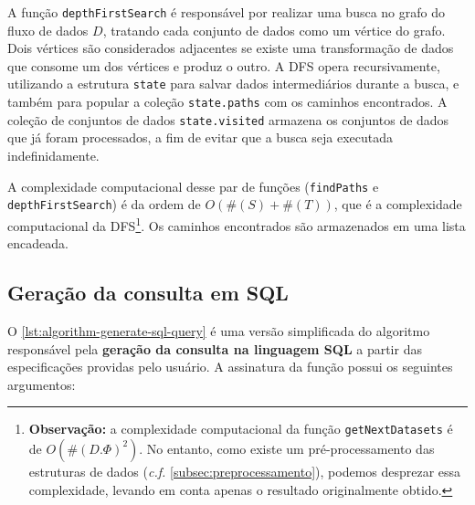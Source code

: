 A função \texttt{depthFirstSearch} é responsável por realizar uma busca no grafo do fluxo de dados \(D\), tratando cada conjunto de dados como um vértice do grafo. Dois vértices são considerados adjacentes se existe uma transformação de dados que consome um dos vértices e produz o outro. A DFS opera recursivamente, utilizando a estrutura \texttt{state} para salvar dados intermediários durante a busca, e também para popular a coleção \texttt{state.paths} com os caminhos encontrados. A coleção de conjuntos de dados \texttt{state.visited} armazena os conjuntos de dados que já foram processados, a fim de evitar que a busca seja executada indefinidamente.

A complexidade computacional desse par de funções (\texttt{findPaths} e \texttt{depthFirstSearch}) é da ordem de \(O(\#(S) + \#(T))\), que é a complexidade computacional da DFS\footnote{\textbf{Observação:} a complexidade computacional da função \texttt{getNextDatasets} é de $O(\#(D.\Phi)^2)$. No entanto, como existe um pré-processamento das estruturas de dados (\textit{c.f.} \autoref{subsec:preprocessamento}), podemos desprezar essa complexidade, levando em conta apenas o resultado originalmente obtido.}. Os caminhos encontrados são armazenados em uma lista encadeada.

\subsection{Geração da consulta em SQL}

O \autoref{lst:algorithm-generate-sql-query} é uma versão simplificada do algoritmo responsável pela \textbf{geração da consulta na linguagem SQL} a partir das especificações providas pelo usuário. A assinatura da função possui os seguintes argumentos:

